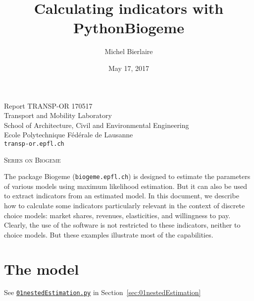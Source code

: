 \documentclass[12pt,a4paper]{article}
\title{Calculating  indicators with PythonBiogeme}
\author{Michel Bierlaire}
\date{May 17, 2017}
\begin{document}
\begin{titlepage}
\pagestyle{empty}

\maketitle
\vspace{2cm}

\begin{center}
\small Report TRANSP-OR 170517\\ Transport and Mobility Laboratory \\ School of Architecture, Civil and Environmental Engineering \\ Ecole Polytechnique F\'ed\'erale de Lausanne \\ \verb+transp-or.epfl.ch+
\begin{center}
\textsc{Series on Biogeme}
\end{center}
\end{center}


\clearpage
\end{titlepage}

The package Biogeme (\texttt{biogeme.epfl.ch}) is designed to estimate
the parameters of various models using maximum likelihood estimation.
But it can also be used to extract indicators from an estimated
model. In this document, we describe how to calculate some indicators
particularly relevant in the context of discrete choice models: market
shares, revenues, elasticities, and willingness to pay. Clearly, the
use of the software is not restricted to these indicators, neither to
choice models. But these examples illustrate most of the
capabilities. 

\section{The model}

\begin{flushright}
See \href{http://biogeme.epfl.ch/examples/indicators/python/01nestedEstimation.py}{\lstinline$01nestedEstimation.py$} in Section~\ref{sec:01nestedEstimation}
\end{flushright}
\end{document}
